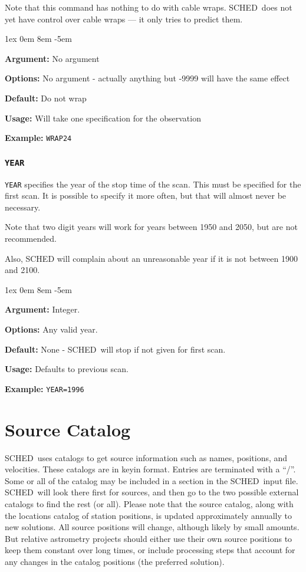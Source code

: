 \documentclass{report}
\newcommand{\sched}{{\sc SCHED}}
\newcommand{\schedb}{{\sc SCHED~}}
\newcommand{\rcwbox}[5]{
  \begin{list}{}{\parsep 1ex  \itemsep 0em
                 \leftmargin 8em  \itemindent -5em }
    \item {\bf Argument:} #1
    \item {\bf Options:}  #2
    \item {\bf Default:}  #3
    \item {\bf Usage:}    #4
    \item {\bf Example:}  #5
  \end{list}
}
\begin{document}
Note that this command has nothing to do with cable wraps.  \schedb does
not yet have control over cable wraps --- it only tries to predict them.

\rcwbox
{No argument}
{No argument - actually anything but -9999 will have the same effect}
{Do not wrap}
{Will take one specification for the observation}
{{\tt WRAP24}}


\subsubsection{\label{MP:YEAR}{\tt YEAR}}

{\tt YEAR} specifies the year of the stop time of the scan. This must
be specified for the first scan.  It is possible to specify it more
often, but that will almost never be necessary.

Note that two digit years will work for years between 1950 and 2050,
but are not recommended.

Also, SCHED will complain about an unreasonable year if it is not between
1900 and 2100.

\rcwbox
{Integer.}
{Any valid year.}
{None - \schedb will stop if not given for first scan.}
{Defaults to previous scan.}
{{\tt YEAR=1996}}



\section{\label{SEC:SRCCAT}Source Catalog}

\schedb uses catalogs to get source information such as names,
positions, and velocities.  These catalogs are in keyin
format. Entries are terminated with a ``/''.  Some or all of the
catalog may be included in a section in the \sched\ input file.
\sched\ will look there first for sources, and then go to the two
possible external catalogs to find the rest (or all).  Please note 
that the source catalog, along with the locations catalog of station
positions, is updated approximately annually to new solutions.  
All source positions will change, although likely by small amounts.
But relative astrometry projects should either use their own 
source positions to keep them constant over long times, or include
processing steps that account for any changes in the catalog positions
(the preferred solution).
\end{document}
